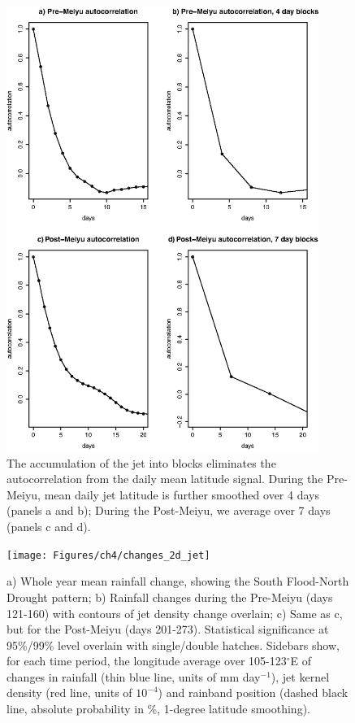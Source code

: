 \begin{figure}[htbp]
\centering
\includegraphics[width=24pc]{Figures/ch4/jet_autocorr}
\caption{The accumulation of the jet into blocks eliminates the autocorrelation from the daily mean latitude signal. During the Pre-Meiyu, mean daily jet latitude is further smoothed over 4 days (panels a and b); During the Post-Meiyu, we average over 7 days (panels c and d).}
\label{fig:jet_autocorr}
\end{figure}

\begin{figure}
\centering
\noindent\texttt{[image: Figures/ch4/changes\_2d\_jet]}
\caption{a) Whole year mean rainfall change, showing the South Flood-North Drought pattern; b) Rainfall changes during the Pre-Meiyu (days 121-160) with contours of jet density change overlain; c) Same as c, but for the Post-Meiyu (days 201-273). Statistical significance at 95\%/99\% level overlain with single/double hatches. Sidebars show, for each time period, the longitude average over 105-123$^{\circ}$E of changes in rainfall (thin blue line, units of mm day$^{-1}$), jet kernel density (red line, units of $10^{-4}$) and rainband position (dashed black line, absolute probability in \%, 1-degree latitude smoothing).}
\label{fig:changes_2d}
\end{figure}

